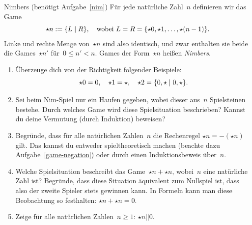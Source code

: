 \documentclass{zirkelblatt}
\newcommand{\fuzzy}{\mathrel{||}}
\begin{document}
\begin{aufgabe}{Nimbers (benötigt Aufgabe~\ref{nim})}
\label{nimbers}
Für jede natürliche Zahl~$n$ definieren wir das Game
\[ \star n := \{ L \mathrel{|} R \}, \quad
\text{wobei~$L = R = \{ \star 0, \star 1, \ldots, \star(n-1) \}$.} \]
Linke und rechte Menge von~$\star n$ sind also identisch, und zwar enthalten
sie beide die Games~$\star n'$ für~$0 \leq n' < n$. Games der Form~$\star n$
heißen \emph{Nimbers}.
\begin{enumerate}
\item Überzeuge dich von der Richtigkeit folgender Beispiele:
\[ \star 0 = 0, \quad
  \star 1 = \star, \quad
  \star 2 = \{ 0,\star \mathrel{|} 0,\star \}. \]
\item Sei beim Nim-Spiel nur ein Haufen gegeben, wobei dieser aus~$n$
Spielsteinen bestehe. Durch welches Game wird diese Spielsituation beschrieben?
Kannst du deine Vermutung (durch Induktion) beweisen?
\item Begründe, dass für alle natürlichen Zahlen~$n$ die Rechenregel
$\star n = -(\star n)$
gilt. Das kannst du entweder spieltheoretisch machen (beachte dazu
Aufgabe~\ref{game-negation}) oder durch einen Induktionsbeweis über~$n$.
\item Welche Spielsituation beschreibt das Game~$\star n + \star n$, wobei~$n$
eine natürliche Zahl ist? Begründe, dass diese Situation äquivalent zum
Nullspiel ist, dass also der zweite Spieler stets gewinnen kann. In Formeln
kann man diese Beobachtung so festhalten: $\star n + \star n = 0.$
\item Zeige für alle natürlichen Zahlen~$n \geq 1$: $\star n \fuzzy 0$.
\end{enumerate}
\end{aufgabe}
\end{document}
